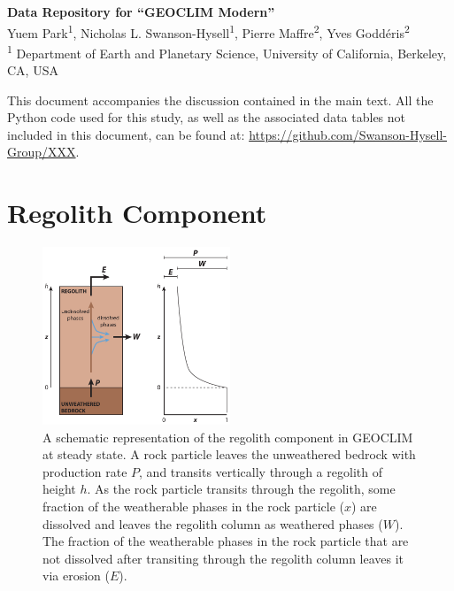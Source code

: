 \documentclass[11pt,letterpaper]{article}
\begin{document}
\begin{flushleft}
{\Large \textbf{Data Repository for ``GEOCLIM Modern''}}
\\
Yuem Park\textsuperscript{1},
Nicholas L. Swanson-Hysell\textsuperscript{1},
Pierre Maffre\textsuperscript{2},
Yves Godd\'eris\textsuperscript{2}
\\
\bigskip
\textsuperscript{1} Department of Earth and Planetary Science, University of California, Berkeley, CA, USA
\\
\bigskip

\end{flushleft}

\linenumbers

This document accompanies the discussion contained in the main text. All the Python code used for this study, as well as the associated data tables not included in this document, can be found at: \url{https://github.com/Swanson-Hysell-Group/XXX}.

\section*{Regolith Component}

\begin{figure}[h!]
\begin{center}
	\includegraphics[width=0.5\textwidth]{../Figures/regolith_schematic.pdf}
	\caption{A schematic representation of the regolith component in GEOCLIM at steady state. A rock particle leaves the unweathered bedrock with production rate $P$, and transits vertically through a regolith of height $h$. As the rock particle transits through the regolith, some fraction of the weatherable phases in the rock particle ($x$) are dissolved and leaves the regolith column as weathered phases ($W$). The fraction of the weatherable phases in the rock particle that are not dissolved after transiting through the regolith column leaves it via erosion ($E$).}
	\label{fig:regolith_schematic}
\end{center}
\end{figure}
\end{document}
